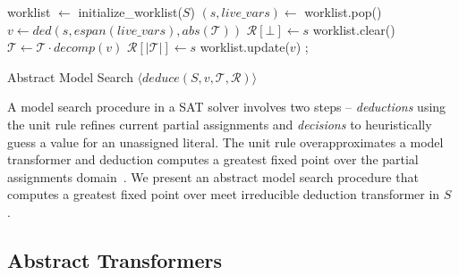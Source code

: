 \begin{algorithm2e}[t]
\DontPrintSemicolon
{}
\begin{small}
worklist $\leftarrow$ initialize\_worklist($S$) \;
{
  $(s,\mathit{live\_vars}) \leftarrow$ worklist.pop() \;
  $v \leftarrow ded(s, \mathit{espan}(\mathit{live\_vars}), \mathit{abs}(\mathcal{T}))$\;
   {
    $\mathcal{R}[\bot] \leftarrow s$ \;
    worklist.clear()  \;
    \return \conflict \;
  }
  \uElse
  {
    $\mathcal{T} \leftarrow \mathcal{T} \cdot \mathit{decomp}(v)$ \; 
    $\mathcal{R}[|\mathcal{T}|] \leftarrow s$ \;
    worklist.update($v$) \; 
  }
}
 {
  \return \sat;
}
\lElse {
 \return \unknown \;
}
\end{small}
\caption{Abstract Model Search $\langle deduce(S,v,\mathcal{T},\mathcal{R}) \rangle$ \label{Alg:ms}}
\end{algorithm2e}
%  
A model search procedure in a SAT solver involves two steps -- {\em deductions} 
using the unit rule refines current partial assignments and 
{\em decisions} to heuristically guess a value for an unassigned 
literal.  The unit rule overapproximates a model transformer and deduction 
computes a greatest fixed point over the partial assignments
domain~\cite{dhk2013-popl}.  We present an abstract model search procedure 
that computes a greatest fixed point over meet irreducible deduction 
transformer in $S$ .  
%

\subsection{Abstract Transformers} \label{sec:abst}

